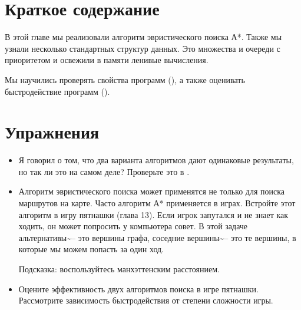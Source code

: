 \section{Краткое содержание}

В этой главе мы реализовали алгоритм эвристического поиска А*. Также мы
узнали несколько стандартных структур данных. Это множества и очереди с
приоритетом и освежили в памяти ленивые вычисления.

Мы научились проверять свойства программ (), а также
оценивать быстродействие программ ().

\section{Упражнения}

\begin{itemize}
\item
  Я говорил о том, что два варианта алгоритмов дают одинаковые
  результаты, но так ли это на самом деле? Проверьте это в
  .
\item
  Алгоритм эвристического поиска может применятся не только для поиска
  маршрутов на карте. Часто алгоритм А* применяется в играх. Встройте
  этот алгоритм в игру пятнашки (глава 13). Если игрок запутался и не
  знает как ходить, он может попросить у компьютера совет. В этой задаче
  альтернативы\textasciitilde{}-- это вершины графа, соседние
  вершины\textasciitilde{}-- это те вершины, в которые мы можем попасть
  за один ход.

  Подсказка: воспользуйтесь манхэттенским расстоянием.
\item
  Оцените эффективность двух алгоритмов поиска в игре пятнашки.
  Рассмотрите зависимость быстродействия от степени сложности игры.
\end{itemize}
